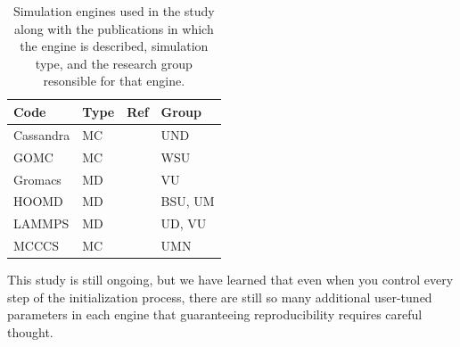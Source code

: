 \begin{table}
\caption{Simulation engines used in the study along with the publications in which the engine is described, simulation type, and the research group resonsible for that engine.}\label{tab:engines}
\centering
\begin{tabular}{llll}
Code      & Type & Ref             & Group   \\ \hline
Cassandra & MC   & \cite{Shah2017} & UND     \\
GOMC      & MC   & \cite{Shah2017} & WSU     \\
Gromacs   & MD   & \cite{ABRAHAM201519, Pall2015, 10.1093/bioinformatics/btt055, Lindahl2001, BERENDSEN199543, https://doi.org/10.1002/jcc.20291, Hess2008} & VU      \\
HOOMD     & MD   & \cite{Anderson2020, Nguyen2011a, Glaser2020a, Lebard2012} & BSU, UM \\
LAMMPS    & MD   & \cite{LAMMPS} & UD, VU  \\
MCCCS     & MC   & \cite{C8SC05340E,Josephson2019} & UMN    
\end{tabular}
\end{table}

This study is still ongoing, but we have learned that even when you control every step of the initialization process, there are still so many additional user-tuned parameters in each engine that guaranteeing reproducibility requires careful thought.

